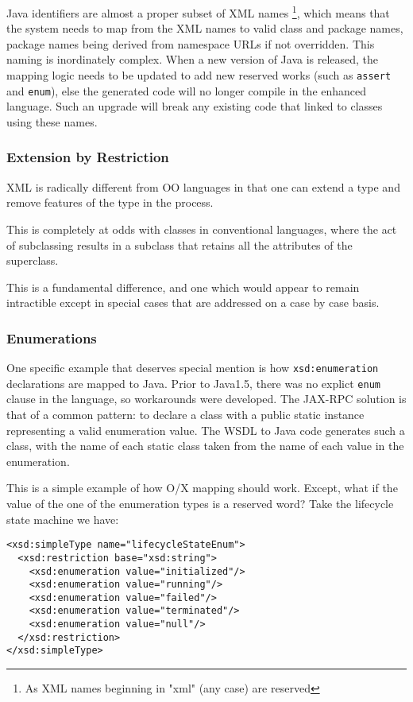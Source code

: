 Java identifiers are almost a proper subset of XML names
\footnote{As XML names beginning in "xml" (any case) are reserved},
which means that the system needs to map from the XML names to valid
class and package names, package names being derived from namespace URLs
if not overridden. This naming is inordinately complex. When a new version
of Java is released, the mapping logic needs to be updated to add new
reserved works (such as \verb|assert| and \verb|enum|), else the
generated code will no longer compile in the enhanced language. Such an
upgrade will break any existing code that linked to classes using these
names. 

\subsubsection{Extension by Restriction}
\label{objections:o-x:validation}

XML is radically different from OO languages in that one can extend
a type and remove features of the type in the process. 

This is completely at odds with classes in conventional languages,
where the act of subclassing results in a subclass that retains all the
attributes of the superclass.

This is a fundamental difference, and one which would appear to remain
intractible except in special cases that are addressed on a case by case
basis.

\subsubsection{Enumerations}

One specific example that deserves special mention is how
\verb$xsd:enumeration$ declarations are mapped to Java. Prior to
Java1.5, there was no explict \verb$enum$ clause in the language, so
workarounds were developed. The JAX-RPC solution is that of a common
pattern: to declare a class with a public static instance representing
a valid enumeration value. The WSDL to Java code generates such a
class, with the name of each static class taken from the name of each
value in the enumeration. 

This is a simple example of how O/X mapping should work. Except, what if the
value of the one of the enumeration types is a reserved word?
Take the lifecycle state machine we have:

\begin{verbatim}
<xsd:simpleType name="lifecycleStateEnum">
  <xsd:restriction base="xsd:string"> 
    <xsd:enumeration value="initialized"/> 
    <xsd:enumeration value="running"/> 
    <xsd:enumeration value="failed"/> 
    <xsd:enumeration value="terminated"/> 
    <xsd:enumeration value="null"/> 
  </xsd:restriction>
</xsd:simpleType>
\end{verbatim}

